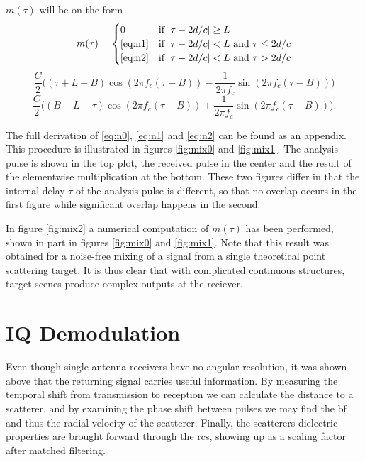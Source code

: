 $m(\tau)$ will be on the form 
\begin{equation}\label{eq:n0}
	m(\tau) = 
	\begin{cases}
		0 & \text{if $|\tau-2d/c|\geq L$} \\
		\text{\eqref{eq:n1}} & \text{if $|\tau-2d/c|<L$ and $\tau \leq 2d/c$} \\
		\text{\eqref{eq:n2}} & \text{if $|\tau-2d/c|<L$ and $\tau > 2d/c$}
	\end{cases}
\end{equation}
\begin{equation}\label{eq:n1}
	\frac{C}{2}\Big((\tau + L - B)\cos(2\pi f_c(\tau - B)) 
	- \frac{1}{2\pi f_c}\sin(2\pi f_c(\tau - B))\Big)
\end{equation}
\begin{equation}\label{eq:n2}
	\frac{C}{2}\Big((B + L - \tau)\cos(2\pi f_c(\tau - B)) 
	+ \frac{1}{2\pi f_c}\sin(2\pi f_c(\tau - B))\Big).
\end{equation}

The full derivation of \eqref{eq:n0}, \eqref{eq:n1} and \eqref{eq:n2} can be found as an appendix. This procedure is illustrated in figures \ref{fig:mix0} and \ref{fig:mix1}. The analysis pulse is shown in the top plot, the received pulse in the center and the result of the elementwise multiplication at the bottom. These two figures differ in that the internal delay $\tau$ of the analysis pulse is different, so that no overlap occurs in the first figure while significant overlap happens in the second.

In figure \ref{fig:mix2} a numerical computation of $m(\tau)$ has been performed, shown in part in figures \ref{fig:mix0} and \ref{fig:mix1}. Note that this result was obtained for a noise-free mixing of a signal from a single theoretical point scattering target. It is thus clear that with complicated continuous structures, target scenes produce complex outputs at the reciever.

\section{IQ Demodulation}
\label{sec:iq}

Even though single-antenna receivers have no angular resolution, it was shown above that the returning signal carries useful information. By measuring the temporal shift from transmission to reception we can calculate the distance to a scatterer, and by examining the phase shift between pulses we may find the \gls{bf} and thus the radial velocity of the scatterer. Finally, the scatterers dielectric properties are brought forward through the \gls{rcs}, showing up as a scaling factor after matched filtering. 

